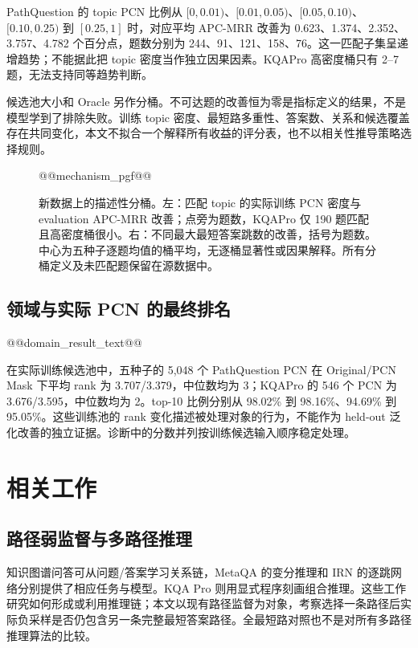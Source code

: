 \documentclass[UTF8,a4paper,10pt,fontset=fandol]{ctexart}
\begin{document}
PathQuestion 的 topic PCN 比例从 $[0,0.01)$、$[0.01,0.05)$、$[0.05,0.10)$、$[0.10,0.25)$ 到 $[0.25,1]$ 时，对应平均 APC-MRR 改善为 0.623、1.374、2.352、3.757、4.782 个百分点，题数分别为 244、91、121、158、76。这一匹配子集呈递增趋势；不能据此把 topic 密度当作独立因果因素。KQAPro 高密度桶只有 2--7 题，无法支持同等趋势判断。

候选池大小和 Oracle 另作分桶。不可达题的改善恒为零是指标定义的结果，不是模型学到了排除失败。训练 topic 密度、最短路多重性、答案数、关系和候选覆盖存在共同变化，本文不拟合一个解释所有收益的评分表，也不以相关性推导策略选择规则。

\begin{figure}[tbp]\centering
\begin{lrbox}{\pcnfigurebox}
@@mechanism_pgf@@
\end{lrbox}\resizebox{\linewidth}{!}{\usebox{\pcnfigurebox}}
\caption{新数据上的描述性分桶。左：匹配 topic 的实际训练 PCN 密度与 evaluation APC-MRR 改善；点旁为题数，KQAPro 仅 190 题匹配且高密度桶很小。右：不同最大最短答案跳数的改善，括号为题数。中心为五种子逐题均值的桶平均，无逐桶显著性或因果解释。所有分桶定义及未匹配题保留在源数据中。}\label{fig:mechanism}
\end{figure}

\subsection{领域与实际 PCN 的最终排名}
@@domain_result_text@@

在实际训练候选池中，五种子的 5,048 个 PathQuestion PCN 在 Original/PCN Mask 下平均 rank 为 3.707/3.379，中位数均为 3；KQAPro 的 546 个 PCN 为 3.676/3.595，中位数均为 2。top-10 比例分别从 98.02\% 到 98.16\%、94.69\% 到 95.05\%。这些训练池的 rank 变化描述被处理对象的行为，不能作为 held-out 泛化改善的独立证据。诊断中的分数并列按训练候选输入顺序稳定处理。

\section{相关工作}
\subsection{路径弱监督与多路径推理}
知识图谱问答可从问题/答案学习关系链，MetaQA 的变分推理和 IRN 的逐跳网络分别提供了相应任务与模型\cite{metaqa,pq}。KQA Pro 则用显式程序刻画组合推理\cite{kqa}。这些工作研究如何形成或利用推理链；本文以现有路径监督为对象，考察选择一条路径后实际负采样是否仍包含另一条完整最短答案路径。全最短路对照也不是对所有多路径推理算法的比较。
\end{document}

